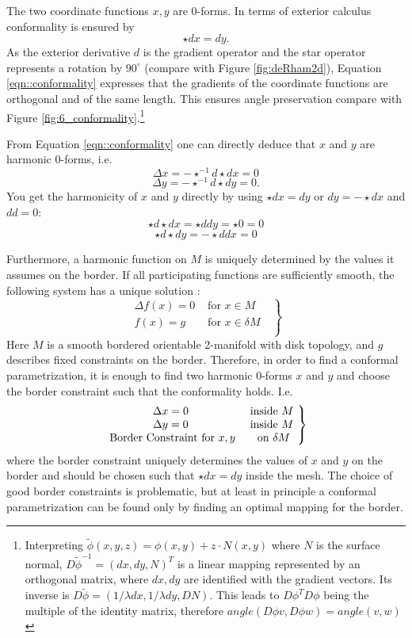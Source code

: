 The two coordinate functions $x,y$ are 0-forms. In terms of exterior calculus conformality is ensured by
\begin{equation}
 \star dx = dy.
 \label{eqn::conformality}
\end{equation}
As the exterior derivative $d$ is the gradient operator and the star operator represents a rotation by $90^\circ$ (compare with Figure \ref{fig:deRham2d}), Equation \ref{eqn::conformality} expresses that the gradients of the coordinate functions are orthogonal and of the same length. This ensures angle preservation compare with Figure \ref{fig:6_conformality}.\footnote{Interpreting $\tilde{\phi}(x,y,z) = \phi(x,y) + z\cdot N(x,y)$ where $N$ is the surface normal, $D\tilde{\phi}^{-1} = (dx ,dy,N)^T$ is a linear mapping represented by an orthogonal matrix, where $dx,dy$ are identified with the gradient vectors. Its inverse is $D\tilde{\phi} = (1/\lambda dx, 1/\lambda dy, DN)$.  This leads to $D\phi^T D\phi$ being the multiple of the identity matrix, therefore $angle (D\phi v , D\phi w )= angle(v,w)$}

From Equation \ref{eqn::conformality} one can directly deduce that $x$ and $y$ are harmonic 0-forms, i.e. 
\[\Delta x = - \star^{-1} d \star d x =0\]
\[\Delta y = - \star^{-1} d \star d y = 0.\] 
You get the harmonicity of $x$ and $y$ directly by using $\star d x = dy$ or $dy = -\star dx$  and $dd = 0$: 
\[\star d \star d x = \star ddy=  \star 0 = 0\]
\[\star d \star d y = -\star d d x = 0\]


Furthermore, a harmonic function on $M$ is uniquely determined by the values it assumes on the border. If all participating functions are sufficiently smooth, the following system has a unique solution :
\[\left.\begin{matrix}
 \Delta f(x) = 0 & \text{ for $x \in M$ } \\
  f(x) = g & \text{ for $x \in \delta M$ } \\
\end{matrix}\right\rbrace\]
Here $M$ is a smooth bordered orientable 2-manifold with disk topology, and $g$ describes fixed constraints on the border. Therefore, in order to find a conformal parametrization, it is enough to find two harmonic 0-forms $x$ and $y$ and choose the border constraint such that the conformality holds. I.e. 
\begin{equation}\left.\begin{matrix}
 \Delta x = 0 & \text{ inside $ M$ } \\
 \Delta y = 0 & \text{ inside $ M$ } \\
 \text{ Border Constraint for $x,y$} & \text{ on $ \delta M$} \\
\end{matrix}\right\rbrace \label{eq:conformalProblemStatement}\end{equation}
where the border constraint uniquely determines the values of $x$ and $y$ on the border and should be chosen such that $\star dx = dy$ inside the mesh. The choice of good border constraints is problematic, but at least in principle a conformal parametrization can be found only by finding an optimal mapping for the border.


